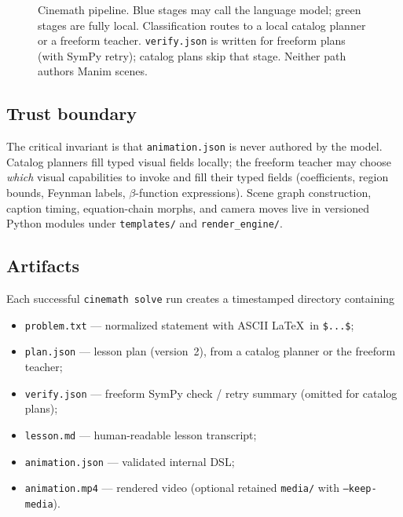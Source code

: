 \documentclass[11pt]{article}
\begin{document}
\begin{figure}[H]
{%
}
\caption{Cinemath pipeline. Blue stages may call the language model; green stages
are fully local. Classification routes to a local catalog planner or a freeform
teacher. \texttt{verify.json} is written for freeform plans (with SymPy retry);
catalog plans skip that stage. Neither path authors Manim scenes.}
\label{fig:pipeline}
\end{figure}

\subsection{Trust boundary}

The critical invariant is that \texttt{animation.json} is never authored by
the model. Catalog planners fill typed visual fields locally; the freeform
teacher may choose \emph{which} visual capabilities to invoke and fill their
typed fields (coefficients, region bounds, Feynman labels, $\beta$-function
expressions). Scene graph construction, caption timing, equation-chain
morphs, and camera moves live in versioned Python modules under
\texttt{templates/} and \texttt{render\_engine/}.

\subsection{Artifacts}

Each successful \texttt{cinemath solve} run creates a timestamped directory
containing
\begin{itemize}
  \item \texttt{problem.txt} --- normalized statement with ASCII \LaTeX\ in
    \texttt{\$...\$};
  \item \texttt{plan.json} --- lesson plan (version~2), from a catalog planner
    or the freeform teacher;
  \item \texttt{verify.json} --- freeform SymPy check / retry summary (omitted
    for catalog plans);
  \item \texttt{lesson.md} --- human-readable lesson transcript;
  \item \texttt{animation.json} --- validated internal DSL;
  \item \texttt{animation.mp4} --- rendered video (optional retained
    \texttt{media/} with \texttt{--keep-media}).
\end{itemize}
\end{document}
